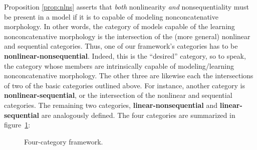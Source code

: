 Proposition \ref{prop:nlns} asserts that \emph{both} nonlinearity \emph{and} nonsequentiality
must be present in a model if it is to capable of modeling nonconcatenative morphology.
 In other words, the category of models capable of the learning nonconcatenative 
 morphology is  the intersection of the (more general) nonlinear and 
 sequential categories. Thus, one of our framework's categories has to be 
 \textbf{nonlinear-nonsequential}. Indeed, this is the ``desired'' category, 
 so to speak, the category whose members are intrinsically capable of modeling/learning
 nonconcatenative morphology. The other three are likewise each the intersections 
 of two of the basic categories outlined above.  For instance, another category is \textbf{nonlinear-sequential}, 
 or the intersection of the nonlinear and sequential categories. The remaining two categories, 
 \textbf{linear-nonsequential} and \textbf{linear-sequential} are analogously defined. The four categories are summarized in figure~\ref{fig:intersections}:

\begin{figure}[h]
\centering
{}
\label{fig:intersections}
\caption{Four-category framework.}
\end{figure}


 

